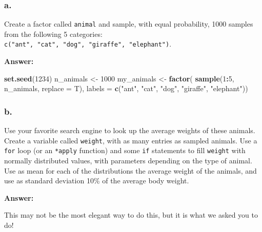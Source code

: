 \documentclass[]{article}
\newenvironment{Shaded}{\begin{snugshade}}{\end{snugshade}}
\newcommand{\DataTypeTok}[1]{\textcolor[rgb]{0.13,0.29,0.53}{#1}}
\newcommand{\DecValTok}[1]{\textcolor[rgb]{0.00,0.00,0.81}{#1}}
\newcommand{\KeywordTok}[1]{\textcolor[rgb]{0.13,0.29,0.53}{\textbf{#1}}}
\newcommand{\NormalTok}[1]{#1}
\newcommand{\OperatorTok}[1]{\textcolor[rgb]{0.81,0.36,0.00}{\textbf{#1}}}
\newcommand{\StringTok}[1]{\textcolor[rgb]{0.31,0.60,0.02}{#1}}
\begin{document}
\hypertarget{a.}{%
\subsubsection{a.}\label{a.}}

Create a factor called \texttt{animal} and sample, with equal
probability, 1000 samples from the following 5 categories:
\texttt{c("ant",\ "cat",\ "dog",\ "giraffe",\ "elephant")}.

\textbf{Answer:}

\begin{Shaded}
\begin{Highlighting}[]
\KeywordTok{set.seed}\NormalTok{(}\DecValTok{1234}\NormalTok{)}
\NormalTok{n_animals <-}\StringTok{ }\DecValTok{1000}
\NormalTok{my_animals <-}\StringTok{ }\KeywordTok{factor}\NormalTok{(}
  \KeywordTok{sample}\NormalTok{(}\DecValTok{1}\OperatorTok{:}\DecValTok{5}\NormalTok{, n_animals, }\DataTypeTok{replace =}\NormalTok{ T), }
  \DataTypeTok{labels =}  \KeywordTok{c}\NormalTok{(}\StringTok{"ant"}\NormalTok{, }\StringTok{"cat"}\NormalTok{, }\StringTok{"dog"}\NormalTok{, }\StringTok{"giraffe"}\NormalTok{, }\StringTok{"elephant"}\NormalTok{))}
\end{Highlighting}
\end{Shaded}

\hypertarget{b.}{%
\subsubsection{b.}\label{b.}}

Use your favorite search engine to look up the average weights of these
animals. Create a variable called \texttt{weight}, with as many entries
as sampled animals. Use a \texttt{for} loop (or an \texttt{*apply}
function) and some \texttt{if} statements to fill \texttt{weight} with
normally distributed values, with parameters depending on the type of
animal. Use as mean for each of the distributions the average weight of
the animals, and use as standard deviation 10\% of the average body
weight.

\textbf{Answer:}

This may not be the most elegant way to do this, but it is what we asked
you to do!
\end{document}
